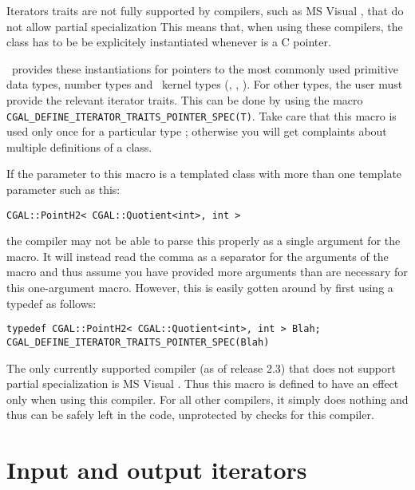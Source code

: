 Iterators traits are not fully supported by compilers, such as MS Visual \CC,
that do not allow partial specialization 
This means that, when using these compilers,
the class  has to be be explicitely
instantiated whenever  is a C pointer.

\cgal\ provides these instantiations for pointers to 
the most commonly used primitive data types, number types and
\cgal\ kernel types (, , \etc).
For other types, the user must provide the relevant iterator traits. 
This can be done by using the macro
\texttt{CGAL\_\-DEFINE\_\-ITERATOR\_\-TRAITS\_\-POINTER\_\-SPEC(T)}.
Take care that this macro is used only once for a particular type ; 
otherwise you will get complaints about multiple definitions of a class.

If the parameter to this macro is a templated class with more than
one template parameter such as this:
\begin{center}
\verb|CGAL::PointH2< CGAL::Quotient<int>, int >|
\end{center}
the compiler may not be able to parse this properly as a single argument for 
the macro. It will instead read the comma as a separator for the arguments of 
the macro and thus assume you have provided more arguments than are necessary
for this one-argument macro.  However, this is easily gotten around by 
first using a typedef as follows:
\begin{verbatim}
typedef CGAL::PointH2< CGAL::Quotient<int>, int > Blah;
CGAL_DEFINE_ITERATOR_TRAITS_POINTER_SPEC(Blah)
\end{verbatim}

The only currently supported compiler (as of release 2.3) that does not
support partial specialization is MS Visual . Thus this macro is defined
to have an effect only when using this compiler.  For all other compilers,
it simply does nothing and thus can be safely left in the code, unprotected
by checks for this compiler.


\section{Input and output iterators}
\label{sec:input_and_output_iterators}

